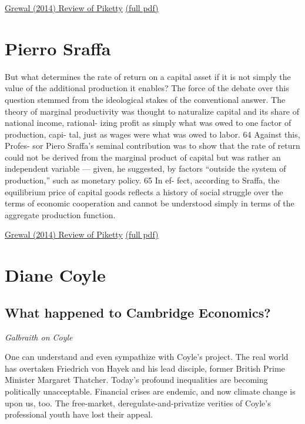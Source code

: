 \documentclass[
]{book}
\begin{document}
\href{https://harvardlawreview.org/2014/12/the-laws-of-capitalism/}{Grewal (2014) Review of Piketty}
\href{pdf/Grewal_2014_laws_of_Capitalism.pdf}{(full pdf)}

\hypertarget{pierro-sraffa}{%
\section{Pierro Sraffa}\label{pierro-sraffa}}

But what determines the rate of return on a capital asset if it is not
simply the value of the additional production it enables? The force of
the debate over this question stemmed from the ideological stakes of
the conventional answer. The theory of marginal productivity was
thought to naturalize capital and its share of national income, rational-
izing profit as simply what was owed to one factor of production, capi-
tal, just as wages were what was owed to labor. 64 Against this, Profes-
sor Piero Sraffa's seminal contribution was to show that the rate of
return could not be derived from the marginal product of capital but
was rather an independent variable --- given, he suggested, by factors
``outside the system of production,'' such as monetary policy. 65 In ef-
fect, according to Sraffa, the equilibrium price of capital goods reflects
a history of social struggle over the terms of economic cooperation and
cannot be understood simply in terms of the aggregate production
function.

\href{https://harvardlawreview.org/2014/12/the-laws-of-capitalism/}{Grewal (2014) Review of Piketty}
\href{pdf/Grewal_2014_laws_of_Capitalism.pdf}{(full pdf)}

\hypertarget{diane-coyle}{%
\section{Diane Coyle}\label{diane-coyle}}

\hypertarget{what-happened-to-cambridge-economics}{%
\subsection{What happened to Cambridge Economics?}\label{what-happened-to-cambridge-economics}}

\emph{Galbraith on Coyle}

One can understand and even sympathize with Coyle's project. The real world has overtaken Friedrich von Hayek and his lead disciple, former British Prime Minister Margaret Thatcher. Today's profound inequalities are becoming politically unacceptable. Financial crises are endemic, and now climate change is upon us, too. The free-market, deregulate-and-privatize verities of Coyle's professional youth have lost their appeal.
\end{document}
